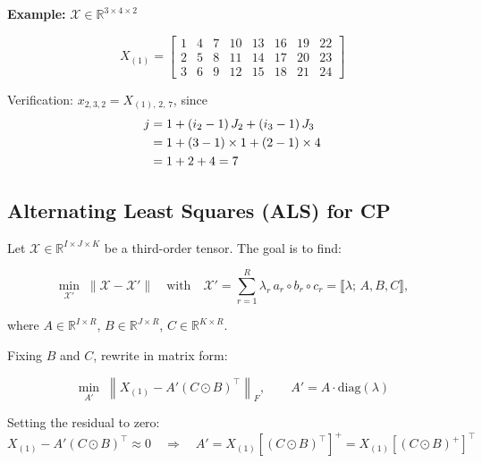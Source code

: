 \documentclass[12pt]{article}
\newcommand{\T}[1]{\mathcal{#1}}   %
\begin{document}
\noindent\textbf{Example:} $\T{X} \in \mathbb{R}^{3 \times 4 \times 2}$

\begin{equation}
X_{(1)} =
\begin{bmatrix}
 1 &  4 &  7 & 10 & 13 & 16 & 19 & 22 \\
 2 &  5 &  8 & 11 & 14 & 17 & 20 & 23 \\
 3 &  6 &  9 & 12 & 15 & 18 & 21 & 24
\end{bmatrix}
\end{equation}

Verification: $x_{2,3,2} = X_{(1),\,2,\,7}$, since
\begin{align}
j &= 1 + (i_2 - 1)\,J_2 + (i_3 - 1)\,J_3 \notag\\
  &= 1 + (3-1)\times 1 + (2-1)\times 4 \notag\\
  &= 1 + 2 + 4 = 7
\end{align}

\subsection{Alternating Least Squares (ALS) for CP}

Let $\T{X} \in \mathbb{R}^{I \times J \times K}$ be a third-order tensor.
The goal is to find:

\begin{equation}
\min_{\T{X}'}\;\|\T{X} - \T{X}'\|
\quad\text{with}\quad
\T{X}' = \sum_{r=1}^{R} \lambda_r\,a_r \circ b_r \circ c_r
= \llbracket \lambda;\, A, B, C \rrbracket,
\end{equation}

where $A \in \mathbb{R}^{I \times R}$, $B \in \mathbb{R}^{J \times R}$, $C \in \mathbb{R}^{K \times R}$.

\medskip
\noindent Fixing $B$ and $C$, rewrite in matrix form:

\begin{equation}
\min_{A'}\;\left\|X_{(1)} - A'(C \odot B)^{\top}\right\|_{F},
\qquad A' = A \cdot \mathrm{diag}(\lambda)
\end{equation}

Setting the residual to zero:
\begin{equation}
X_{(1)} - A'(C \odot B)^{\top} \approx 0
\quad\Rightarrow\quad
A' = X_{(1)}\left[(C \odot B)^{\top}\right]^{+}
   = X_{(1)}\left[(C \odot B)^{+}\right]^{\top}
\end{equation}
\end{document}
